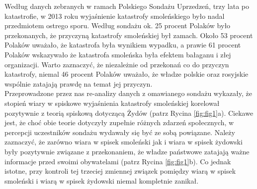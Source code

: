 \documentclass[man]{apa6}
\begin{document}
    Według danych zebranych w ramach Polskiego Sondażu Uprzedzeń, trzy lata po katastrofie, w 2013 roku wyjaśnienie katastrofy smoleńskiego było nadal przedmiotem ostrego sporu. Według sondażu \parencite[patrz,][]{soral2015socjo} ok. 25 procent Polaków było przekonanych, że przyczyną katastrofy smoleńskiej był zamach. Około 53 procent Polaków uważało, że katastrofa była wynikiem wypadku, a prawie 61 procent Polaków wskazywało że katastrofa smoleńska była efektem bałaganu i złej organizacji. Warto zaznaczyć, że niezależnie od przekonań co do przyczyn katastrofy, niemal 46 procent Polaków uważało, że władze polskie oraz rosyjskie wspólnie zatajają prawdę na temat jej przyczyn.\\
    Przeprowadzone przez nas re-analizy danych z omawianego sondażu wykazały, że stopień wiary w spiskowe wyjaśnienia katastrofy smoleńskiej korelował pozytywnie z teorią spiskową dotyczącą Żydów (patrz Rycina \ref{fig:fig1}a). Ciekawe jest, że choć obie teorie dotyczyły zupełnie różnych zdarzeń społecznych, w percepcji uczestników sondażu wydawały się być ze sobą powiązane. Należy zaznaczyć, że zarówno wiara w spisek smoleński jak i wiara w spisek żydowski były pozytywnie związane z przekonaniem, że władze państwowe zatajają ważne informacje przed swoimi obywatelami (patrz Rycina \ref{fig:fig1}b). Co jednak istotne, przy kontroli tej trzeciej zmiennej związek pomiędzy wiarą w spisek smoleński i wiarą w spisek żydowski niemal kompletnie zanikał.\\

	\begin{figure*}[htbp]
   		\centering
   		\caption{Związek pomiędzy wiarą w spisek smoleński a antysemityzmem spiskowym, bez -- a -- i przy kontroli -- b -- poziomu przekonania, że władze zatajają informacje przed obywatelami. \\ *$p$ < 0,05 **$p$ < 0,01 **$p$ < 0,001}
   		\label{fig:fig1}
	\end{figure*}
\end{document}
